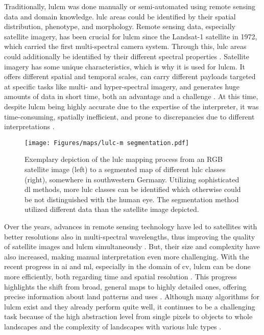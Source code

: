 Traditionally, \gls{lulcm} was done manually or semi-automated using remote sensing data and domain knowledge. \gls{lulc} areas could be identified by their spatial distribution, phenotype, and morphology. Remote sensing data, especially satellite imagery, has been crucial for \gls{lulcm} since the Landsat-1 satellite in 1972, which carried the first multi-spectral camera system. Through this, \gls{lulc} areas could additionally be identified by their different spectral properties \autocite{Ustin.Middleton2021,Zhang.Li2022}. Satellite imagery has some unique characteristics, which is why it is used for \gls{lulcm}. It offers different spatial and temporal scales, can carry different payloads targeted at specific tasks like multi- and hyper-spectral imagery, and generates huge amounts of data in short time, both an advantage and a challenge \autocite{Rolf.Klemmer.ea2024}. At this time, despite \gls{lulcm} being highly accurate due to the expertise of the interpreter, it was time-consuming, spatially inefficient, and prone to discrepancies due to different interpretations \autocite{Rangel.Terven.ea2024,Tzepkenlis.Marthoglou.ea2023}.

\begin{figure}[htb]
    \centering
    \texttt{[image: Figures/maps/lulc-m segmentation.pdf]}
    \caption[ Mapping]{Exemplary depiction of the \gls{lulc} mapping process from an RGB satellite image (left) to a segmented map of different \gls{lulc} classes (right), somewhere in southwestern Germany. Utilizing sophisticated \gls{dl} methods, more \gls{lulc} classes can be identified which otherwise could be not distinguished with the human eye. The segmentation method utilized different data than the satellite image depicted.}
    \label{fig:lulc_seg}
\end{figure}

Over the years, advances in remote sensing technology have led to satellites with better resolutions also in multi-spectral wavelengths, thus improving the quality of satellite images and \gls{lulcm} simultaneously \autocite{Alhassan.Henry.ea2020,Cao.Zhu.ea2018,Kussul.Lavreniuk.ea2017,Zhang.Li2022}. But, their size and complexity have also increased, making manual interpretation even more challenging. With the recent progress in \gls{ai} and \gls{ml}, especially in the domain of \gls{cv}, \gls{lulcm} can be done more efficiently, both regarding time and spatial resolution \autocite{Comber.Wulder2019,Zhao.Tu.ea2023}. This progress highlights the shift from broad, general maps to highly detailed ones, offering precise information about land patterns and uses \autocite{Comber.Wulder2019,Ongsulee2017,Zhang.Li2022}. Although many algorithms for \gls{lulcm} exist and they already perform quite well, it continues to be a challenging task because of the high abstraction level from single pixels to objects to whole landscapes and the complexity of landscapes with various \gls{lulc} types \autocite{Qi.Wu.ea2015,Zhao.Tu.ea2023}.

